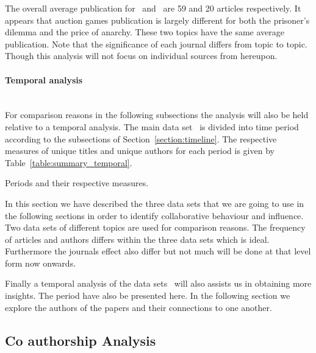 \documentclass{article}
\begin{document}
The overall average publication for~\cite{} and~\cite{} are 59 and 20 articles
respectively. It appears that auction games publication is largely different
for both the prisoner's dilemma and the price of anarchy. These two topics have
the same average publication. Note that the significance of each journal differs
from topic to topic. Though this analysis will not focus on individual sources
from hereupon.

\paragraph{Temporal analysis}
\mbox{ }\\

For comparison reasons in the following subsections the analysis will also be
held relative to a temporal analysis. The main data set~\cite{}
is divided into time period according to the subsections of Section~\ref{section:timeline}.
The respective measures of unique titles and unique authors for each period is
given by Table~\ref{table:summary_temporal}.

\begin{table}[!hbtp]
    \begin{center}
    
    \end{center}
    \caption{Periods and their respective measures.}
    \label{table:summary_temporal}
\end{table}

In this section we have described the three data sets that we are going to use
in the following sections in order to identify collaborative behaviour and influence.
Two data sets of different topics are used for comparison reasons. The frequency of
articles and authors differs within the three data sets which is ideal. Furthermore
the journals effect also differ but not much will be done at that level form now
onwards.

Finally a temporal analysis of the data sets~\cite{} will also assists us in
obtaining more insights. The period have also be presented here.
In the following section we explore the authors of the papers and their
connections to one another.

\subsection{Co authorship Analysis}

\end{document}
